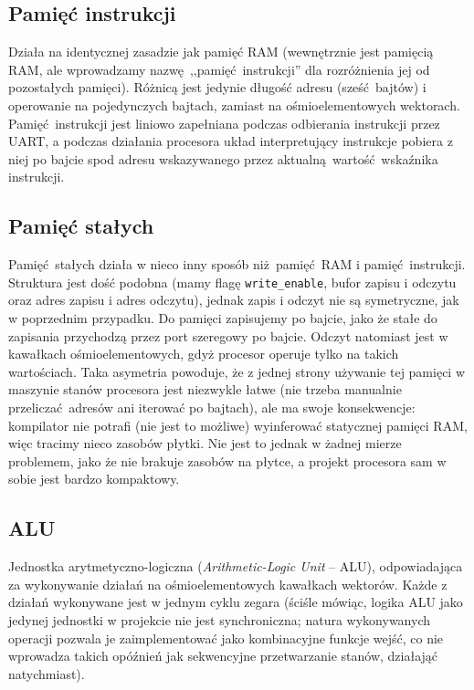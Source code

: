 \subsection{Pamięć instrukcji}

Działa na identycznej zasadzie jak pamięć RAM (wewnętrznie jest pamięcią RAM, ale wprowadzamy nazwę ,,pamięć instrukcji'' dla rozróżnienia jej od pozostałych pamięci). Różnicą jest jedynie długość adresu (sześć bajtów) i operowanie na pojedynczych bajtach, zamiast na ośmioelementowych wektorach. Pamięć instrukcji jest liniowo zapełniana podczas odbierania instrukcji przez UART, a podczas działania procesora układ interpretujący instrukcje pobiera z niej po bajcie spod adresu wskazywanego przez aktualną wartość wskaźnika instrukcji.


\subsection{Pamięć stałych}

Pamięć stałych działa w nieco inny sposób niż pamięć RAM i pamięć instrukcji. Struktura jest dość podobna (mamy flagę \texttt{write\_enable}, bufor zapisu i odczytu oraz adres zapisu i adres odczytu), jednak zapis i odczyt nie są symetryczne, jak w poprzednim przypadku. Do pamięci zapisujemy po bajcie, jako że stałe do zapisania przychodzą przez port szeregowy po bajcie. Odczyt natomiast jest w kawałkach ośmioelementowych, gdyż procesor operuje tylko na takich wartościach. Taka asymetria powoduje, że z jednej strony używanie tej pamięci w maszynie stanów procesora jest niezwykle łatwe (nie trzeba manualnie przeliczać adresów ani iterować po bajtach), ale ma swoje konsekwencje: kompilator nie potrafi (nie jest to możliwe) wyinferować statycznej pamięci RAM, więc tracimy nieco zasobów płytki. Nie jest to jednak w żadnej mierze problemem, jako że nie brakuje zasobów na płytce, a projekt procesora sam w sobie jest bardzo kompaktowy.


\subsection{ALU}

Jednostka arytmetyczno-logiczna (\textit{Arithmetic-Logic Unit} -- ALU), odpowiadająca za wykonywanie działań na ośmioelementowych kawałkach wektorów. Każde z działań wykonywane jest w jednym cyklu zegara (ściśle mówiąc, logika ALU jako jedynej jednostki w projekcie nie jest synchroniczna; natura wykonywanych operacji pozwala je zaimplementować jako kombinacyjne funkcje wejść, co nie wprowadza takich opóźnień jak sekwencyjne przetwarzanie stanów, działająć natychmiast).

